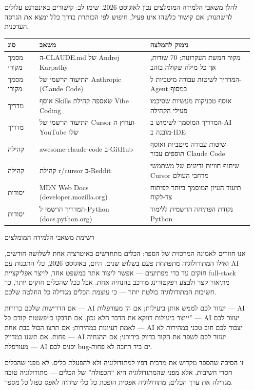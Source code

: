 להלן משאבי הלמידה המומלצים נכון לאוגוסט 2026. שימו לב: קישורים באינטרנט עלולים להשתנות; אם קישור כלשהו אינו פעיל, חיפוש לפי הכותרת בדרך כלל ימצא את הגרסה העדכנית.

\begin{center}
\begin{tabularx}{\linewidth}{|X|X|X|}
\hline
\textbf{סוג} & \textbf{משאב} & \textbf{נימוק להמלצה} \tabularnewline
\hline
מסמך מקורי & ה-CLAUDE.md של Andrej Karpathy & מקור חמשת העקרונות; 70 שורות, אך כל מילה שקולה בזהב \tabularnewline
מסמך מקורי & התיעוד הרשמי של Anthropic (Claude Code) & המדריך לשיטות עבודה מיטביות ל-Agent במסוף \tabularnewline
מדריך & אוסף Skills שאספה קהילת Vibe Coding & אוסף טכניקות מעשיות שסיכמו פעילי הקהילה \tabularnewline
מדריך & התיעוד הרשמי של Cursor וערוץ ה-YouTube שלו & המדריך המוסמך לשימוש ב-AI מובנה ב-IDE \tabularnewline
קהילה & awesome-claude-code ב-GitHub & שיטות עבודה מיטביות ואוסף תוספים עבור Claude Code \tabularnewline
קהילה & קהילת r/cursor ב-Reddit & שיתוף חוויות ודיונים של משתמשי Cursor מרחבי העולם \tabularnewline
יסודות & MDN Web Docs (developer.mozilla.org) & תיעוד העיון המוסמך ביותר לפיתוח צד-לקוח \tabularnewline
יסודות & המדריך הרשמי ל-Python (docs.python.org) & נקודת הפתיחה הרשמית ללימוד Python \tabularnewline
\hline
\end{tabularx}
\end{center}

\begin{center}\small\color{gray}רשימת משאבי הלמידה המומלצים\end{center}


אנו חוזרים לאמונה המרכזית של הספר: הכלים מתחדשים באיטרציה אחת לשלושה חודשים, ואילו המתודולוגיה מתפתחת פעם בשלוש שנים. היום, באוגוסט 2026, כלי התכנות עם AI חזקים עד כדי מפתיעים — אפשר ליצור אתר במשפט אחד, לייצר אפליקציית full-stack מתיאור קצר ולבצע רפקטורינג מורכב בהנחיה אחת. אבל ככל שהכלים חזקים יותר, כך חשיבות המתודולוגיה בולטת יותר — כי עוצמת הכלים מגדילה כל החלטה שלכם.

אם הדרישות שלכם ברורות — AI יעזור לכם לממש אותן ביעילות; אם הן מעורפלות — AI יייצר ביעילות דווקא את הדבר הלא נכון. אם תדבקו ב“פשטות קודם כל” — AI יעזור לכם לאמת רעיונות במהירות; אם תרצו הכול בבת אחת — AI יצבור לכם חוב טכני במהירות לא פחות. אם תשנו במדויק — AI יעזור לכם לשפר את הקוד בדיוק כירורגי; אם ההנחיה מעורפלת — AI יכניס לכם bug-ים ביד רחבה לא פחות.

זו הסיבה שהספר מקדיש את מרבית דפיו למתודולוגיה ולא להפעלת כלים. לא מפני שהכלים חסרי חשיבות, אלא מפני שהמתודולוגיה היא “הכפולה” של הכלים — מתודולוגיה טובה מגדילה את ערך הכלים; מתודולוגיה אפסית הופכת כל כלי שיהיה לאפס כפול כל מספר.


